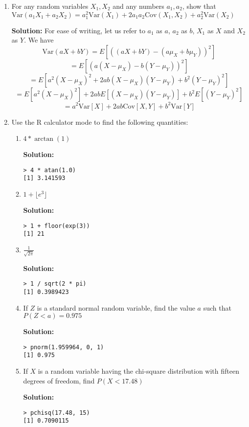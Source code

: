 \documentclass[11pt]{article} %
\newcommand{\tr}{\textrm}
\newcommand{\var}{\tr{Var}}
\newcommand{\cov}{\tr{Cov}}
\begin{document}
\begin{enumerate}
\item For any random variables $X_1, X_2$ and any numbers $a_1, a_2$, show that $\var(a_1X_1 + a_2X_2) = a_1^2\var(X_1) + 2a_1a_2\cov(X_1, X_2) + a_2^2\var(X_2)$

{\bf Solution:} For ease of writing, let us refer to $a_1$ as $a$, $a_2$ as $b$, $X_1$ as $X$ and $X_2$ as $Y$.  We have 
$$\var(aX + bY) = E[((aX + bY) - (a\mu_X + b\mu_Y))^2]$$ 
$$= E[(a(X - \mu_X) - b(Y - \mu_Y))^2]$$
$$= E[a^2(X - \mu_X)^2 + 2ab(X - \mu_X)(Y-\mu_Y) + b^2(Y - \mu_Y)^2] $$
$$= E[a^2(X - \mu_X)^2] + 2abE[(X - \mu_X)(Y-\mu_Y)] + b^2 E[(Y - \mu_Y)^2]$$
$$= a^2\var[X] + 2ab\cov[X,Y] + b^2\var[Y]$$

\item Use the R calculator mode to find the following quantities:

\begin{enumerate}

\item $4 * \arctan(1)$

{\bf Solution:} \begin{verbatim}
> 4 * atan(1.0)
[1] 3.141593
\end{verbatim}

\item $1 + \lfloor e^3\rfloor$

{\bf Solution:}\begin{verbatim}
> 1 + floor(exp(3))
[1] 21
\end{verbatim}

\item $\frac{1}{\sqrt{2\pi}}$

{\bf Solution:}\begin{verbatim}
> 1 / sqrt(2 * pi)
[1] 0.3989423
\end{verbatim}

\item If $Z$ is a standard normal random variable, find the value $a$ such that $P(Z < a) = 0.975$

{\bf Solution:}\begin{verbatim}
> pnorm(1.959964, 0, 1)
[1] 0.975
\end{verbatim}

\item If $X$ is a random variable having the chi-square distribution with fifteen degrees of freedom, find $P(X < 17.48)$

{\bf Solution:}\begin{verbatim}
> pchisq(17.48, 15)
[1] 0.7090115
\end{verbatim}


\end{enumerate}
\end{enumerate}
\end{document}
